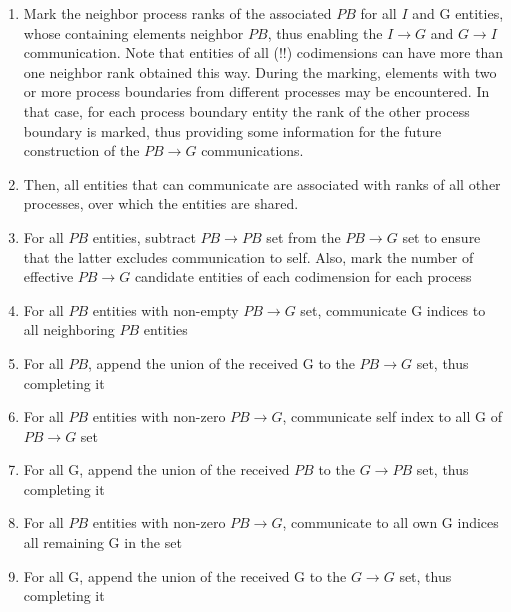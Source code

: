 \begin{mybox}
\begin{enumerate}
	\item Mark the neighbor process ranks of the associated $PB$ for all $I$ and G entities, whose containing elements neighbor $PB$, thus enabling the $I \rightarrow G$ and $G \rightarrow I$ communication. Note that entities of all (!!) codimensions can have more than one neighbor rank obtained this way. During the marking, elements with two or more process boundaries from different processes may be encountered. In that case, for each process boundary entity the rank of the other process boundary is marked, thus providing some information for the future construction of the $PB \rightarrow G$ communications.
	\item Then, all entities that can communicate are associated with ranks of all other processes, over which the entities are shared.%
	\item For all $PB$ entities, subtract $PB\rightarrow PB$ set from the $PB \rightarrow G$ set to ensure that the latter excludes communication to self. Also, mark the number of effective $PB \rightarrow G$ candidate entities of each codimension for each process
	\item For all $PB$ entities with non-empty $PB \rightarrow G$ set, communicate G indices to all neighboring $PB$ entities
	\item For all $PB$, append the union of the received G to the $PB \rightarrow G$ set, thus completing it %
	\item For all $PB$ entities with non-zero $PB \rightarrow G$, communicate self index to all G of $PB \rightarrow G$ set
	\item For all G, append the union of the received $PB$ to the $G \rightarrow PB$ set, thus completing it %
	\item For all $PB$ entities with non-zero $PB \rightarrow G$, communicate to all own G indices all remaining G in the set
	\item For all G, append the union of the received G to the $G \rightarrow G$ set, thus completing it %
\end{enumerate}
\end{mybox}



